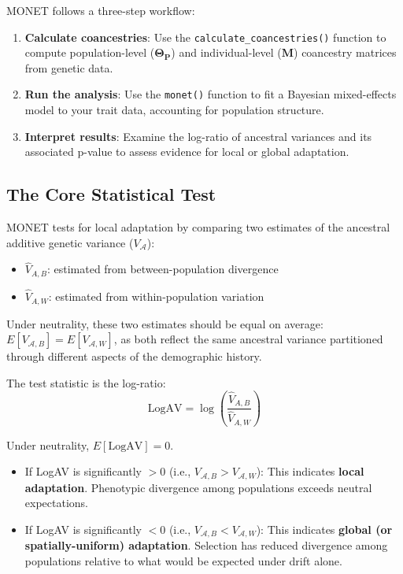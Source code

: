 \documentclass[11pt]{article}
\begin{document}
MONET follows a three-step workflow:

\begin{enumerate}
\item \textbf{Calculate coancestries}: Use the \texttt{calculate\_coancestries()} function to compute population-level ($\mathbf{\Theta_P}$) and individual-level ($\mathbf{M}$) coancestry matrices from genetic data.

\item \textbf{Run the analysis}: Use the \texttt{monet()} function to fit a Bayesian mixed-effects model to your trait data, accounting for population structure.

\item \textbf{Interpret results}: Examine the log-ratio of ancestral variances and its associated p-value to assess evidence for local or global adaptation.
\end{enumerate}

\subsection{The Core Statistical Test}

MONET tests for local adaptation by comparing two estimates of the ancestral additive genetic variance ($V_\mathcal{A}$):

\begin{itemize}
\item $\hat{V}_{A,B}$: estimated from between-population divergence
\item $\hat{V}_{A,W}$: estimated from within-population variation
\end{itemize}

Under neutrality, these two estimates should be equal on average: $E[V_{ \mathcal{A},B}] = E[V_{ \mathcal{A},W}]$, as both reflect the same ancestral variance partitioned through different aspects of the demographic history.

The test statistic is the log-ratio:
$$\text{LogAV} = \log\left(\frac{\hat{V}_{A,B}}{\hat{V}_{A,W}}\right)$$

Under neutrality, $E[\text{LogAV}] = 0$. 

\begin{itemize}
\item If LogAV is significantly $> 0$ (i.e., $V_{ \mathcal{A},B} > V_{ \mathcal{A},W}$): This indicates \textbf{local adaptation}. Phenotypic divergence among populations exceeds neutral expectations.

\item If LogAV is significantly $< 0$ (i.e., $V_{ \mathcal{A},B} < V_{ \mathcal{A},W}$): This indicates \textbf{global (or spatially-uniform) adaptation}. Selection has reduced divergence among populations relative to what would be expected under drift alone.
\end{itemize}
\end{document}
